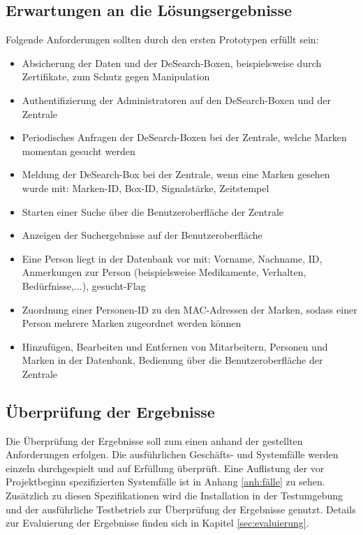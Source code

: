 \subsection{Erwartungen an die Lösungsergebnisse}
Folgende Anforderungen sollten durch den ersten Prototypen erfüllt sein:
\begin{itemize}
	\item  Absicherung der Daten und der DeSearch-Boxen, beispielsweise durch Zertifikate, zum Schutz gegen Manipulation
	\item Authentifizierung der Administratoren auf den DeSearch-Boxen und der Zentrale 
	\item Periodisches Anfragen der DeSearch-Boxen bei der Zentrale, welche Marken momentan gesucht werden
	\item Meldung der DeSearch-Box bei der Zentrale, wenn eine Marken gesehen wurde mit: Marken-ID, Box-ID, Signalstärke, Zeitstempel
	\item Starten einer Suche über die Benutzeroberfläche der Zentrale
	\item Anzeigen der Suchergebnisse auf der Benutzeroberfläche
	\item Eine Person liegt in der Datenbank vor mit: Vorname, Nachname, ID, Anmerkungen zur Person (beispielsweise Medikamente, Verhalten, Bedürfnisse,...), gesucht-Flag
	\item Zuordnung einer Personen-ID zu den MAC-Adressen der Marken, sodass einer Person mehrere Marken zugeordnet werden können
	\item Hinzufügen, Bearbeiten und Entfernen von Mitarbeitern, Personen und Marken in der Datenbank, Bedienung über die Benutzeroberfläche der Zentrale
\end{itemize}


\subsection{Überprüfung der Ergebnisse}
Die Überprüfung der Ergebnisse soll zum einen anhand der gestellten Anforderungen erfolgen. Die ausführlichen Geschäfts- und Systemfälle werden einzeln durchgespielt und auf Erfüllung überprüft. Eine Auflistung der vor Projektbeginn spezifizierten Systemfälle ist in Anhang \ref{anh:fälle} zu sehen. Zusätzlich zu diesen Spezifikationen wird die Installation in der Testumgebung und der ausführliche Testbetrieb zur Überprüfung der Ergebnisse genutzt. Details zur Evaluierung der Ergebnisse finden sich in Kapitel \ref{sec:evaluierung}.









